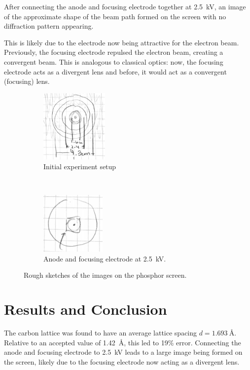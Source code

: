 \documentclass[notitlepage]{report}
\begin{document}
	After connecting the anode and focusing electrode together at \SI{2.5}{\kV}, an image of the approximate shape of the beam path formed on the screen with no diffraction pattern appearing.
	
	This is likely due to the electrode now being attractive for the electron beam. Previously, the focusing electrode repulsed the electron beam, creating a convergent beam. This is analogous to classical optics: now, the focusing electrode acts as a divergent lens and before, it would act as a convergent (focusing) lens.
	

	\begin{figure}[p]
		\centering
		\begin{subfigure}[t]{0.5\textwidth}
			\centering
			\includegraphics[height=1.4in]{init}
			\caption{Initial experiment setup}
		\end{subfigure}%
		~ 
		\begin{subfigure}[t]{0.5\textwidth}
			\centering
			\includegraphics[height=1.2in]{divergent}
			\caption{Anode and focusing electrode at \SI{2.5}{\kV}.}
		\end{subfigure}
		\caption{Rough sketches of the images on the phosphor screen.}
	\end{figure}
	\section{Results and Conclusion}
	The carbon lattice was found to have an average lattice spacing $d=\SI{1.693}{\angstrom}$. Relative to an accepted value of \SI{1.42}{\angstrom}, this led to 19\% error. Connecting the anode and focusing electrode to \SI{2.5}{\kV} leads to a large image being formed on the screen, likely due to the focusing electrode now acting as a divergent lens.
	
	\pagebreak
\end{document}

